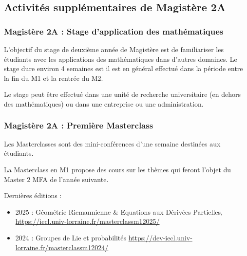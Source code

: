 \documentclass[slidetop,11pt]{beamer}
\begin{document}
\subsection{Activités supplémentaires de Magistère 2A}

\begin{frame}
\frametitle{Magistère 2A : Stage d’application des mathématiques}

L’objectif du stage de deuxième année de Magistère est de familiariser les étudiants avec les applications des mathématiques dans d’autres domaines. Le stage dure environ 4 semaines est il est en général effectué dans la période entre la fin du M1 et la rentrée du M2.

Le stage peut être effectué dans une unité de recherche universitaire (en dehors des mathématiques) ou dans une entreprise ou une administration.
\end{frame}


\begin{frame}
\frametitle{Magistère 2A : Première Masterclass}

Les Masterclasses sont des mini-conférences d'une semaine destinées aux  étudiants.

La Masterclass en  M1 propose des cours sur les thèmes qui feront l'objet du Master 2 MFA de l'année suivante.

Dernières éditions :
\begin{itemize}
\item 2025 : Géométrie Riemannienne \& Equations aux Dérivées Partielles,  \url{https://iecl.univ-lorraine.fr/masterclassm12025/}
\item 2024 : Groupes de Lie et probabilités \url{https://dev-iecl.univ-lorraine.fr/masterclassm12024/}
\end{itemize}

\end{frame}
\end{document}
